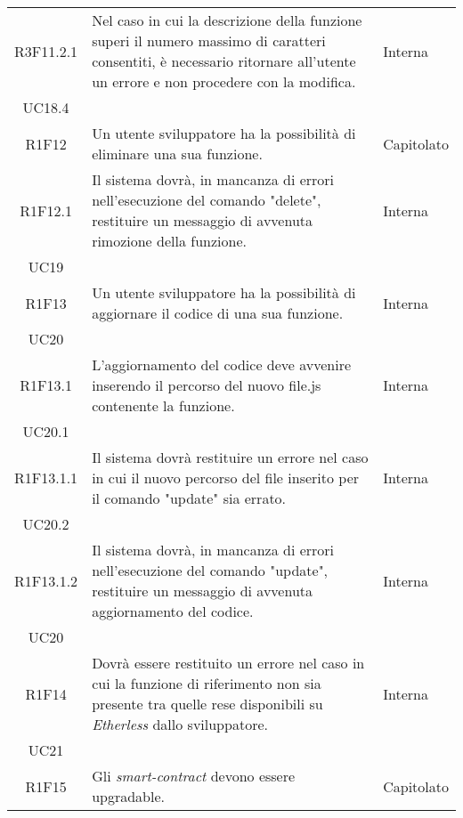 \begin{longtable}{|c|p{8cm}|C{2cm}|}
	R3F11.2.1 &  Nel caso in cui la descrizione della funzione superi il numero massimo di caratteri consentiti, è necessario ritornare all'utente un errore e non procedere con la modifica. & \centering Interna \\ UC18.4 \tabularnewline
	
	R1F12 &  Un utente sviluppatore ha la possibilità di eliminare una sua funzione. & Capitolato \\
	
	R1F12.1 & Il sistema dovrà, in mancanza di errori nell'esecuzione del comando "delete", restituire un messaggio di avvenuta rimozione della funzione. & \centering Interna \\ UC19 \tabularnewline
	
	R1F13 &  Un utente sviluppatore ha la possibilità di aggiornare il codice di una sua funzione. & \centering Interna \\ UC20 \tabularnewline
	
	R1F13.1 &  L'aggiornamento del codice deve avvenire inserendo il percorso del nuovo file.js contenente la funzione. & \centering Interna \\ UC20.1 \tabularnewline
	
	R1F13.1.1 & Il sistema dovrà restituire un errore nel caso in cui il nuovo percorso del file inserito per il comando "update" sia errato. & \centering Interna \\ UC20.2 \tabularnewline
	
	R1F13.1.2 & Il sistema dovrà, in mancanza di errori nell'esecuzione del comando "update", restituire un messaggio di avvenuta aggiornamento del codice. & \centering Interna \\ UC20 \tabularnewline
	
	
	
	R1F14 &  Dovrà essere restituito un errore nel caso in cui la funzione di riferimento non sia presente tra quelle rese disponibili su \textit{Etherless} dallo sviluppatore. & \centering Interna \\ UC21 \tabularnewline
	
	R1F15 & Gli \textit{smart-contract\glo} devono essere upgradable. & Capitolato \\
	\hline
	
\end{longtable}